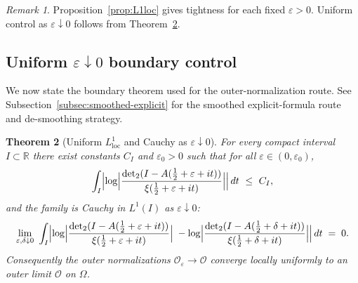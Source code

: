 \documentclass[11pt]{article}
\newtheorem{theorem}{Theorem}
\theoremstyle{definition}
\theoremstyle{remark}
\newtheorem{remark}[theorem]{Remark}
\newcommand{\R}{\mathbb{R}}
\DeclareMathOperator{\dettwo}{det_2}
\begin{document}
\begin{remark}
Proposition~\ref{prop:L1loc} gives tightness for each fixed \(\varepsilon>0\). Uniform control as \(\varepsilon\downarrow 0\) follows from Theorem~\ref{thm:uniform-eps}.
\end{remark}

\subsection{Uniform \(\varepsilon\downarrow 0\) boundary control}\label{subsec:uniform-eps}
We now state the boundary theorem used for the outer-normalization route. See Subsection~\ref{subsec:smoothed-explicit} for the smoothed explicit-formula route and de-smoothing strategy.

\begin{theorem}[Uniform $L^1_{\mathrm{loc}}$ and Cauchy as \(\varepsilon\downarrow 0\)]\label{thm:uniform-eps}
For every compact interval $I\subset\R$ there exist constants $C_I$ and \(\varepsilon_0>0\) such that for all \(\varepsilon\in(0,\varepsilon_0)\),
\[
 \int_I \Bigl|\log\Bigl|\frac{\dettwo(I-A(\tfrac12+\varepsilon+it))}{\xi(\tfrac12+\varepsilon+it)}\Bigr|\Bigr|\,dt\ \le\ C_I,
\]
and the family is Cauchy in $L^1(I)$ as \(\varepsilon\downarrow 0\):
\[
 \lim_{\substack{\varepsilon,\delta\downarrow 0}}\ \int_I \Bigl|\log\Bigl|\frac{\dettwo(I-A(\tfrac12+\varepsilon+it))}{\xi(\tfrac12+\varepsilon+it)}\Bigr|\;-
 \log\Bigl|\frac{\dettwo(I-A(\tfrac12+\delta+it))}{\xi(\tfrac12+\delta+it)}\Bigr|\Bigr|\,dt\;=\;0.
\]
Consequently the outer normalizations \(\mathcal O_{\varepsilon}\to \mathcal O\) converge locally uniformly to an outer limit \(\mathcal O\) on \(\Omega\).
\end{theorem}
\end{document}

